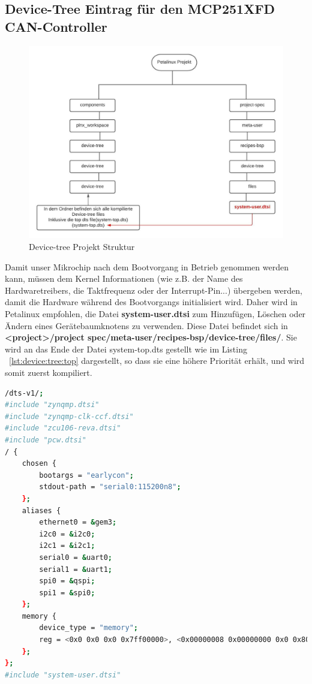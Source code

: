 \subsection{Device-Tree Eintrag für den MCP251XFD CAN-Controller }
\begin{figure}[H]
	\begin{center}		\includegraphics[width=1\textwidth]{./images/device-tree-diagram.jpg}
	\end{center}
	\vspace{-5pt}
	\caption[Device-tree Projekt Struktur]{Device-tree Projekt Struktur} %
	\label{fig:deviceTree:struktur}
	\vspace{-5pt}
\end{figure}

Damit unser Mikrochip nach dem Bootvorgang in Betrieb genommen werden kann, müssen dem Kernel Informationen (wie z.B. der Name des Hardwaretreibers, die Taktfrequenz oder der Interrupt-Pin...) übergeben werden, damit die Hardware während des Bootvorgangs initialisiert wird. Daher wird in Petalinux empfohlen, die Datei \textbf{system-user.dtsi} zum Hinzufügen, Löschen oder Ändern eines Gerätebaumknotens zu verwenden. Diese Datei befindet sich in \textbf{<project>/project spec/meta-user/recipes-bsp/device-tree/files/}. Sie wird an das Ende der Datei system-top.dts gestellt wie im Listing ~\ref{lst:device:tree:top} dargestellt, so dass sie eine höhere Priorität erhält, und wird somit zuerst kompiliert.

\begin{lstlisting}[backgroundcolor = \color{lightgray},basicstyle=\scriptsize\ttfamily,caption={Inhalt der system-top.dts Datei},label=lst:device:tree:top,language=bash,framexleftmargin = 2em]
/dts-v1/;
#include "zynqmp.dtsi"
#include "zynqmp-clk-ccf.dtsi"
#include "zcu106-reva.dtsi"
#include "pcw.dtsi"
/ {
	chosen {
		bootargs = "earlycon";
		stdout-path = "serial0:115200n8";
	};
	aliases {
		ethernet0 = &gem3;
		i2c0 = &i2c0;
		i2c1 = &i2c1;
		serial0 = &uart0;
		serial1 = &uart1;
		spi0 = &qspi;
		spi1 = &spi0;
	};
	memory {
		device_type = "memory";
		reg = <0x0 0x0 0x0 0x7ff00000>, <0x00000008 0x00000000 0x0 0x80000000>;
	};
};
#include "system-user.dtsi"	
\end{lstlisting}

